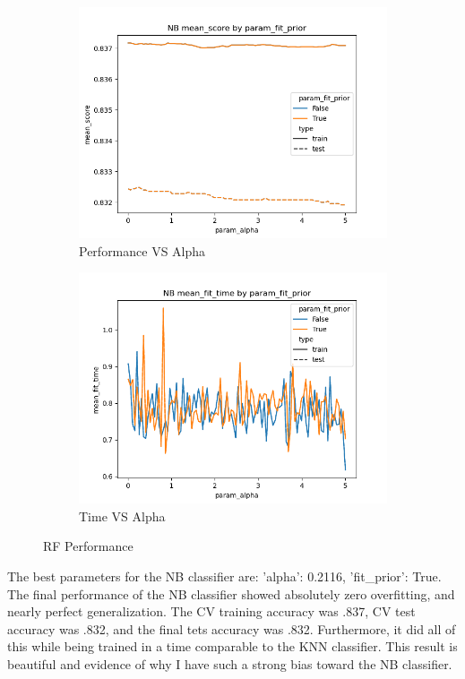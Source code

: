 \documentclass[12pt]{article}
\begin{document}
\begin{figure}
  \begin{subfigure}{.5\textwidth}
  \includegraphics[width=.95\textwidth]{../results/nb/param_fit_prior_mean_score_param_alpha.png}
    \caption{Performance VS Alpha}
    \end{subfigure}%
  \begin{subfigure}{.5\textwidth}
    \includegraphics[width=.95\textwidth]{../results/nb/param_fit_prior_mean_fit_time_param_alpha.png}
    \caption{Time VS Alpha}
  \end{subfigure}
  \caption{RF Performance}
  \label{figure4}
\end{figure}

The best parameters for the NB classifier are: {'alpha': 0.2116, 'fit\_prior': True}. The final performance of the NB 
classifier showed absolutely zero overfitting, and nearly perfect generalization. The CV training accuracy was .837,
CV test accuracy was .832, and the final tets accuracy was .832. Furthermore, it did all of this while being trained 
in a time comparable to the KNN classifier. This result is beautiful and evidence of why I have such a strong bias toward 
the NB classifier.
\end{document}
